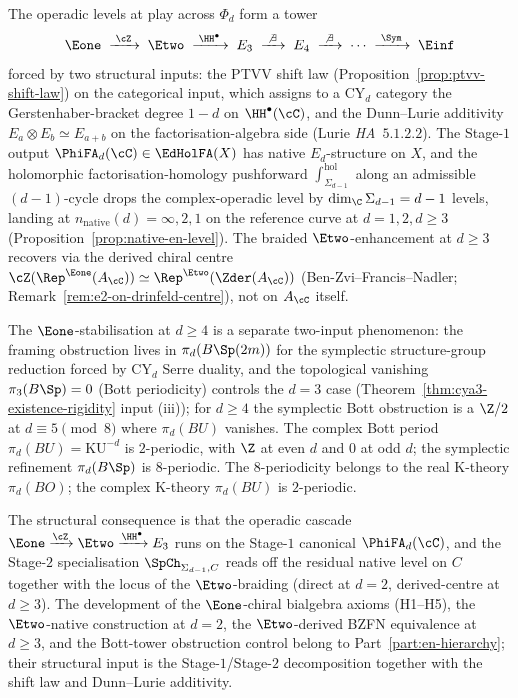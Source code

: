 \begin{remark}
\label{rem:en-tower-derived-consequence}
The operadic levels at play across $\Phi_d$ form a tower
\[
 \Eone \;\xrightarrow{\;\cZ\;}\; \Etwo
 \;\xrightarrow{\;\HH^\bullet\;}\; E_3
 \;\xrightarrow{\;\not\;\exists\;}\; E_4
 \;\xrightarrow{\;\not\;\exists\;}\; \cdots
 \;\xrightarrow{\;\Sym\;}\; \Einf
\]
forced by two structural inputs: the PTVV shift law
(Proposition~\ref{prop:ptvv-shift-law}) on the categorical input,
which assigns to a CY$_d$ category the Gerstenhaber-bracket degree
$1 - d$ on $\HH^\bullet(\cC)$, and the Dunn--Lurie additivity
$E_a \otimes E_b \simeq E_{a + b}$ on the factorisation-algebra side
(Lurie \emph{HA}~$5.1.2.2$). The Stage-$1$ output
$\PhiFA_d(\cC) \in \EdHolFA(X)$ has native $E_d$-structure on $X$,
and the holomorphic factorisation-homology pushforward
$\int_{\Sigma_{d-1}}^{\mathrm{hol}}$ along an admissible
$(d-1)$-cycle drops the complex-operadic level by
$\dim_\C \Sigma_{d-1} = d - 1$ levels, landing at
$n_{\mathrm{native}}(d) = \infty, 2, 1$ on the reference curve at
$d = 1, 2, d \ge 3$ (Proposition~\ref{prop:native-en-level}). The
braided $\Etwo$-enhancement at $d \ge 3$ recovers via the derived
chiral centre $\cZ(\Rep^{\Eone}(A_\cC)) \simeq
\Rep^{\Etwo}(\Zder(A_\cC))$ (Ben-Zvi--Francis--Nadler;
Remark~\ref{rem:e2-on-drinfeld-centre}), not on $A_\cC$ itself.

The $\Eone$-stabilisation at $d \ge 4$ is a separate two-input
phenomenon: the framing obstruction lives in $\pi_d(B\Sp(2m))$ for
the symplectic structure-group reduction forced by CY$_d$ Serre
duality, and the topological vanishing $\pi_3(B\Sp) = 0$ (Bott
periodicity) controls the $d = 3$ case
(Theorem~\ref{thm:cya3-existence-rigidity} input (iii)); for
$d \ge 4$ the symplectic Bott obstruction is a $\Z/2$ at
$d \equiv 5 \pmod 8$ where $\pi_d(BU)$ vanishes. The complex Bott
period $\pi_d(BU) = \mathrm{KU}^{-d}$ is $2$-periodic, with $\Z$ at
even $d$ and $0$ at odd $d$; the symplectic refinement
$\pi_d(B\Sp)$ is $8$-periodic. The $8$-periodicity belongs to the
real K-theory $\pi_d(BO)$; the complex K-theory $\pi_d(BU)$ is
$2$-periodic.

The structural consequence is that the operadic cascade
$\Eone \xrightarrow{\cZ} \Etwo \xrightarrow{\HH^\bullet} E_3$ runs on
the Stage-$1$ canonical $\PhiFA_d(\cC)$, and the Stage-$2$
specialisation $\SpCh_{\Sigma_{d-1}, C}$ reads off the residual
native level on $C$ together with the locus of the $\Etwo$-braiding
(direct at $d = 2$, derived-centre at $d \ge 3$). The development of
the $\Eone$-chiral bialgebra axioms (H1--H5), the $\Etwo$-native
construction at $d = 2$, the $\Etwo$-derived BZFN equivalence at
$d \ge 3$, and the Bott-tower obstruction control belong to
Part~\ref{part:en-hierarchy}; their structural input
is the Stage-$1$/Stage-$2$ decomposition together with the
shift law and Dunn--Lurie additivity.
\end{remark}

